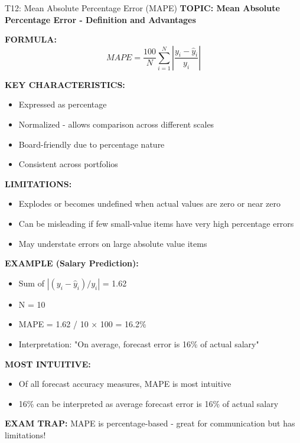 \documentclass[8pt]{beamer}
\begin{document}
	\begin{frame}{T12: Mean Absolute Percentage Error (MAPE)}
		\fontsize{6.5}{7.5}\selectfont
		\textbf{TOPIC: Mean Absolute Percentage Error - Definition and Advantages}
		
		\vspace{0.1cm}
		\textbf{FORMULA:}
		\[
		MAPE = \frac{100}{N}\sum_{i=1}^N \left|\frac{y_i - \hat{y}_i}{y_i}\right|
		\]
		
		\vspace{0.1cm}
		\textbf{KEY CHARACTERISTICS:}
		\begin{itemize}
			\item Expressed as percentage
			\item Normalized - allows comparison across different scales
			\item Board-friendly due to percentage nature
			\item Consistent across portfolios
		\end{itemize}
		
		\vspace{0.1cm}
		\textbf{LIMITATIONS:}
		\begin{itemize}
			\item Explodes or becomes undefined when actual values are zero or near zero
			\item Can be misleading if few small-value items have very high percentage errors
			\item May understate errors on large absolute value items
		\end{itemize}
		
		\vspace{0.1cm}
		\textbf{EXAMPLE (Salary Prediction):}
		\begin{itemize}
			\item Sum of $|(y_i - \hat{y}_i)/y_i|$ = 1.62
			\item N = 10
			\item MAPE = 1.62 / 10 × 100 = 16.2\%
			\item Interpretation: "On average, forecast error is 16\% of actual salary"
		\end{itemize}
		
		\vspace{0.1cm}
		\textbf{MOST INTUITIVE:}
		\begin{itemize}
			\item Of all forecast accuracy measures, MAPE is most intuitive
			\item 16\% can be interpreted as average forecast error is 16\% of actual salary
		\end{itemize}
		
		\textcolor{myred}{\textbf{EXAM TRAP:}} MAPE is \textcolor{myblue}{percentage-based} - great for communication but has limitations!
	\end{frame}
	
\end{document}
